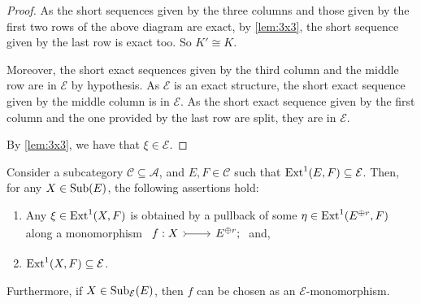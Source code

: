 \begin{proof}
As the short sequences given by the three columns and those given by the first two rows of the above diagram are exact, by \cref{lem:3x3}, the short sequence given by the last row is exact too. So $K' \cong K$. 

Moreover, the short exact sequences given by the third column and the middle row are in $\mathcal{E}$ by hypothesis. As $\mathcal{E}$ is an exact structure, the short exact sequence given by the middle column is in $\mathcal{E}$. As the short exact sequence given by the first column and the one provided by the last row are split, they are in $\mathcal{E}$.

By \cref{lem:3x3}, we have that $\xi \in {\mathcal{E}}$. 
\end{proof}

\begin{lemma}
\label{lem:SublocalEadapt}
Consider a subcategory $\mathscr{C} \subseteq \mathscr{A}$, and $E,F \in \mathscr{C}$ such that $\operatorname{Ext}^1(E,F) \subseteq \mathcal{E}$. Then, for any $X \in \operatorname{Sub}(E)$, the following assertions hold:
\begin{enumerate}[label=$(\alph*)$,itemsep=1mm]
   \item Any $\xi \in \operatorname{Ext}^1(X,F)$ is obtained by a pullback of some $\eta \in \operatorname{Ext}^1(E^{\oplus r},F)$ along a monomorphism $ \begin{tikzcd}
	 f: X & E^{\oplus r};
	\arrow[tail,from=1-1, to=1-2]
   \end{tikzcd}$ and,
   \item $\operatorname{Ext}^1(X,F) \subseteq \mathcal{E}$.
\end{enumerate}
Furthermore, if $X \in \operatorname{Sub}_\mathcal{E}(E)$, then $f$ can be chosen as an $\mathcal{E}$-monomorphism.   
\end{lemma}

